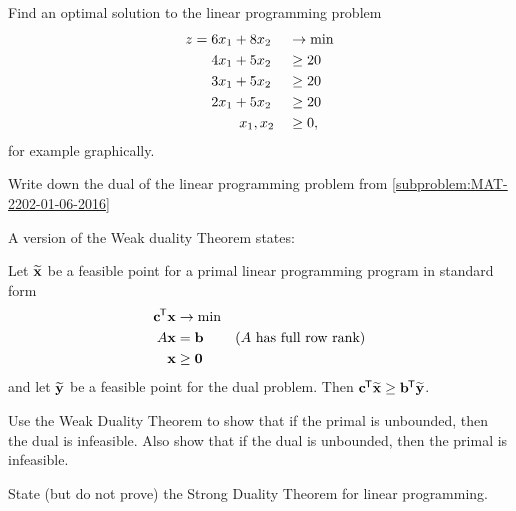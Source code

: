\titlebox[english]


\Problem

\begin{subproblem}
    \label{subproblem:MAT-2202-01-06-2016}
    Find an optimal solution to the linear programming problem
    \begin{alignat*}{2}
        z ={}& 6x_1 + 8x_2 && \to \min \\
            & 4x_1 + 5x_2 && \geq 20 \\
            & 3x_1 + 5x_2 && \geq 20 \\
            & 2x_1 + 5x_2 && \geq 20 \\
            & \hspace{0.7cm}x_1, x_2 && \geq 0,
    \end{alignat*}
    for example graphically.
\end{subproblem}

\begin{subproblem}
    Write down the dual of the linear programming problem from \cref{subproblem:MAT-2202-01-06-2016}
\end{subproblem}

\begin{subproblem}
    A version of the Weak duality Theorem states:
    \begin{theorem}
        Let $\widetilde{\mathbf{x}}$ be a feasible point for a primal linear programming program in standard form
        \begin{alignat*}{2}
            \mathbf{c}^{\mkern-1.5mu\mathsf{T}} \mathbf{x} & \to \min &&\\
            A \mathbf{x} & = \mathbf{b} && \text{($A$ has full row rank)} \\
            \mathbf{x} & \geq \mathbf{0} &&
        \end{alignat*}
        and let $\widetilde{\mathbf{y}}$ be a feasible point for the dual problem.
        Then $\mathbf{c}^{\mkern-1.5mu\mathsf{T}}\widetilde{\mathbf{x}}\geq \mathbf{b}^{\mkern-1.5mu\mathsf{T}}\widetilde{\mathbf{y}}$.
    \end{theorem}
    Use the Weak Duality Theorem to show that if the primal is unbounded, then the dual is infeasible. Also show that if the dual is unbounded, then the primal is infeasible.
\end{subproblem}

\begin{subproblem}
    State (but do not prove) the Strong Duality Theorem for linear programming.
\end{subproblem}


